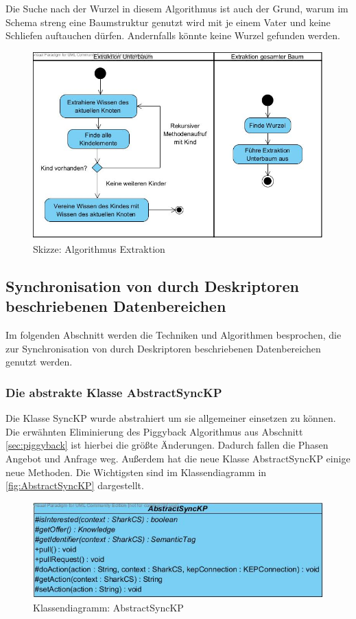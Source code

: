 \documentclass[a4paper]{article}
\begin{document}
	Die Suche nach der Wurzel in diesem Algorithmus ist auch der Grund, warum
	im Schema streng eine Baumstruktur genutzt wird mit je einem Vater und keine
	Schliefen auftauchen dürfen. Andernfalls könnte keine Wurzel gefunden werden.
	
	\begin{figure}[H]
		\includegraphics[width=\linewidth]{../Bilder/extraction.jpg}
		\caption{Skizze: Algorithmus Extraktion}
		\label{fig:extraction}
	\end{figure}	
	
	\subsection{Synchronisation von durch Deskriptoren beschriebenen Datenbereichen}	
	
	Im folgenden Abschnitt werden die Techniken und Algorithmen besprochen, die
	zur Synchronisation von durch Deskriptoren beschriebenen Datenbereichen genutzt
	werden.
	
	\subsubsection{Die abstrakte Klasse AbstractSyncKP}
	
	Die Klasse SyncKP wurde abstrahiert um sie allgemeiner einsetzen zu können.
	Die erwähnten Eliminierung des Piggyback Algorithmus aus Abschnitt
	\ref{sec:piggyback} ist hierbei die größte Änderungen. Dadurch fallen die 
	Phasen Angebot und Anfrage weg. Außerdem hat die neue Klasse
	AbstractSyncKP einige neue Methoden. Die Wichtigsten sind im Klassendiagramm
	in \autoref{fig:AbstractSyncKP} dargestellt.
	
	\begin{figure}[H]
		\includegraphics[width=\linewidth]{../Bilder/AbstractSyncKP.jpg}
		\caption{Klassendiagramm: AbstractSyncKP}
		\label{fig:AbstractSyncKP}
	\end{figure}	
	
\end{document}
